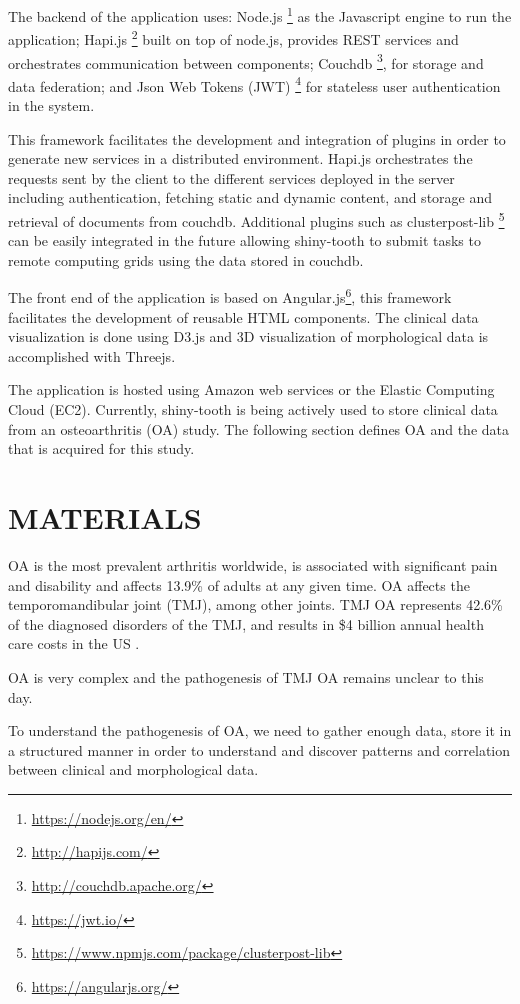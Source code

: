 \documentclass[]{spie}  %
\begin{document}
The backend of the application uses: Node.js \footnote{\url{https://nodejs.org/en/}} as the Javascript engine to run the application; Hapi.js \footnote{\url{http://hapijs.com/}} built on top of node.js, provides REST services and orchestrates communication between components; Couchdb \footnote{\url{http://couchdb.apache.org/}}, for storage and data federation; and Json Web Tokens (JWT) \footnote{\url{https://jwt.io/}} for stateless user authentication in the system.

This framework facilitates the development and integration of plugins in order to generate new services 
in a distributed environment. Hapi.js orchestrates the requests sent by the client 
to the different services deployed in the server including authentication, fetching static and dynamic content, and storage and retrieval of documents from couchdb. Additional plugins such as clusterpost-lib \footnote{\url{https://www.npmjs.com/package/clusterpost-lib}} can be easily integrated in the future allowing shiny-tooth to submit tasks to remote computing grids using the data stored in couchdb.

The front end of the application is based on Angular.js\footnote{\url{https://angularjs.org/}}, this framework facilitates the development of reusable HTML components.
The clinical data visualization is done using D3.js and 3D visualization of morphological data is accomplished with Threejs.

The application is hosted using Amazon web services or the Elastic Computing Cloud (EC2). Currently, shiny-tooth is being actively used 
to store clinical data from an osteoarthritis (OA) study. 
The following section defines OA and the data that is acquired for this study. 

\section{MATERIALS}

OA is the most prevalent arthritis worldwide, is associated with significant pain and disability and affects 13.9\% of adults at any given
time. OA affects the temporomandibular joint (TMJ), among other joints. 
TMJ OA represents 42.6\% of the diagnosed disorders of the TMJ, and results in \$4 billion annual health care costs in the US\cite{Cevidanes2010110}
\cite{Paniagua2011345}. 

OA is very complex and the pathogenesis of TMJ OA remains unclear to this day.

To understand the pathogenesis of OA, we need to gather enough data, store it in a structured manner in order to understand 
and discover patterns and correlation between clinical and morphological data.
\end{document}
